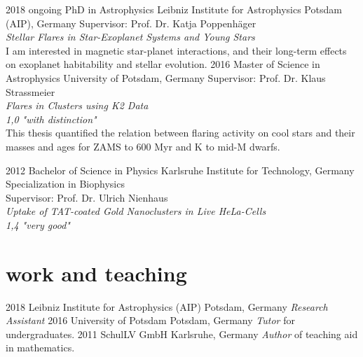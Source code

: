 \documentclass[]{k-cv} %
\begin{document}
\begin{entrylist}
\entry
{2018 \to ongoing}
{PhD {\normalfont in Astrophysics}}
{Leibniz Institute for Astrophysics Potsdam (AIP), Germany}
{Supervisor: Prof. Dr. Katja Poppenh\"ager\\
\emph{Stellar Flares in Star-Exoplanet Systems and Young Stars} \vspace{0.2cm}\\ I am interested in magnetic star-planet interactions, and their long-term effects on exoplanet habitability and stellar evolution.}
\entry
{2016 }
{Master {\normalfont of Science in Astrophysics}}
{University of Potsdam, Germany}
{Supervisor: Prof. Dr. Klaus Strassmeier\\
\emph{Flares in Clusters using K2 Data} \\ 
\emph{1,0 "with distinction"}\vspace{0.2cm}\\
This thesis quantified the relation between flaring activity on cool stars and their masses and ages for ZAMS to 600 Myr and K to mid-M dwarfs.}


\entry
{2012 }
{Bachelor {\normalfont of Science in Physics}}
{Karlsruhe Institute for Technology, Germany}
{Specialization in Biophysics\\
Supervisor: Prof. Dr. Ulrich Nienhaus\\
\emph{Uptake of TAT-coated Gold Nanoclusters in Live HeLa-Cells}\\
\emph{1,4 "very good"}}
\end{entrylist}

\section{work and teaching}

\begin{entrylist}

\entry
{2018}
{Leibniz Institute for Astrophysics (AIP)}
{Potsdam, Germany}
{\emph{Research Assistant}}
\entry
{2016 }
{University of Potsdam}
{Potsdam, Germany}
{\emph{Tutor} for undergraduates.}
\entry
{2011 }
{SchulLV GmbH}
{Karlsruhe, Germany}
{\emph{Author} of teaching aid in mathematics.}
\end{entrylist}
\end{document}
